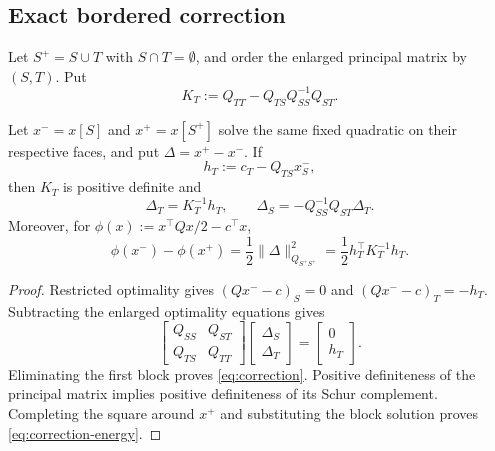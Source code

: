 \subsection{Exact bordered correction}

Let $S^+=S\cup T$ with $S\cap T=\emptyset$, and order the enlarged principal
matrix by $(S,T)$.  Put
\begin{equation}
 K_T:=Q_{TT}-Q_{TS}Q_{SS}^{-1}Q_{ST}.
 \label{eq:frontier-schur}
\end{equation}

\begin{proposition}
\label{prop:correction}
Let $x^-=x[S]$ and $x^+=x[S^+]$ solve the same fixed quadratic on their
respective faces, and put $\Delta=x^+-x^-$.  If
\begin{equation}
 h_T:=c_T-Q_{TS}x^-_S,
 \label{eq:frontier-demand}
\end{equation}
then $K_T$ is positive definite and
\begin{equation}
 \Delta_T=K_T^{-1}h_T,
 \qquad
 \Delta_S=-Q_{SS}^{-1}Q_{ST}\Delta_T.
 \label{eq:correction}
\end{equation}
Moreover, for
$\phi(x):=x^\top Qx/2-c^\top x$,
\begin{equation}
 \phi(x^-)-\phi(x^+)
 =\frac12\|\Delta\|_{Q_{S^+S^+}}^2
 =\frac12h_T^\top K_T^{-1}h_T.
 \label{eq:correction-energy}
\end{equation}
\end{proposition}

\begin{proof}
Restricted optimality gives
$(Qx^--c)_S=0$ and
$(Qx^--c)_T=-h_T$.  Subtracting the enlarged optimality equations gives
\[
 \begin{bmatrix}Q_{SS}&Q_{ST}\\Q_{TS}&Q_{TT}\end{bmatrix}
 \begin{bmatrix}\Delta_S\\\Delta_T\end{bmatrix}
 =\begin{bmatrix}0\\h_T\end{bmatrix}.
\]
Eliminating the first block proves \cref{eq:correction}.  Positive
definiteness of the principal matrix implies positive definiteness of its
Schur complement.  Completing the square around $x^+$ and substituting the
block solution proves \cref{eq:correction-energy}.
\end{proof}

